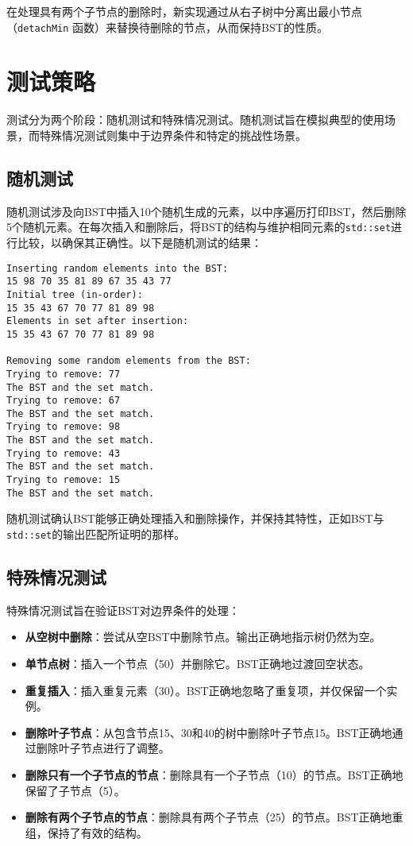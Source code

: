 \documentclass[UTF8]{ctexart}
\begin{document}
在处理具有两个子节点的删除时，新实现通过从右子树中分离出最小节点（\texttt{detachMin} 函数）来替换待删除的节点，从而保持BST的性质。

\section{测试策略}
测试分为两个阶段：随机测试和特殊情况测试。随机测试旨在模拟典型的使用场景，而特殊情况测试则集中于边界条件和特定的挑战性场景。

\subsection{随机测试}
随机测试涉及向BST中插入10个随机生成的元素，以中序遍历打印BST，然后删除5个随机元素。在每次插入和删除后，将BST的结构与维护相同元素的\texttt{std::set}进行比较，以确保其正确性。以下是随机测试的结果：

\begin{verbatim}
Inserting random elements into the BST:
15 98 70 35 81 89 67 35 43 77
Initial tree (in-order):
15 35 43 67 70 77 81 89 98
Elements in set after insertion:
15 35 43 67 70 77 81 89 98

Removing some random elements from the BST:
Trying to remove: 77
The BST and the set match.
Trying to remove: 67
The BST and the set match.
Trying to remove: 98
The BST and the set match.
Trying to remove: 43
The BST and the set match.
Trying to remove: 15
The BST and the set match.
\end{verbatim}

随机测试确认BST能够正确处理插入和删除操作，并保持其特性，正如BST与\texttt{std::set}的输出匹配所证明的那样。

\subsection{特殊情况测试}
特殊情况测试旨在验证BST对边界条件的处理：
\begin{itemize}
    \item \textbf{从空树中删除}：尝试从空BST中删除节点。输出正确地指示树仍然为空。
    \item \textbf{单节点树}：插入一个节点（50）并删除它。BST正确地过渡回空状态。
    \item \textbf{重复插入}：插入重复元素（30）。BST正确地忽略了重复项，并仅保留一个实例。
    \item \textbf{删除叶子节点}：从包含节点15、30和40的树中删除叶子节点15。BST正确地通过删除叶子节点进行了调整。
    \item \textbf{删除只有一个子节点的节点}：删除具有一个子节点（10）的节点。BST正确地保留了子节点（5）。
    \item \textbf{删除有两个子节点的节点}：删除具有两个子节点（25）的节点。BST正确地重组，保持了有效的结构。
\end{itemize}
\end{document}
